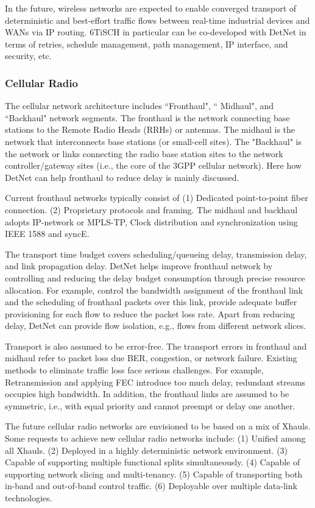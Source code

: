 \documentclass[12pt]{article}
\begin{document}
In the future, wireless networks are expected to enable converged transport of deterministic and best-effort traffic flows between real-time industrial devices and WANs via IP routing. 6TiSCH in particular can be co-developed with DetNet in terms of retries, schedule management, path management, IP interface, and security, etc.

\subsubsection{Cellular Radio}
The cellular network architecture includes ``Fronthaul", `` Midhaul", and ``Backhaul" network segments.  The fronthaul is the network connecting base stations to the Remote Radio Heads (RRHs) or antennas. The midhaul is the network that interconnects base stations (or small-cell sites).  The "Backhaul" is the network or links connecting the radio base station sites to the network    controller/gateway sites (i.e., the core of the 3GPP cellular network). 
Here how DetNet can help fronthaul to reduce delay is mainly discussed.

Current fronthaul networks typically consist of (1) Dedicated point-to-point fiber connection. (2) Proprietary protocols and framing. The midhaul and backhaul adopts IP-network or MPLS-TP, Clock distribution and synchronization using IEEE 1588 and syncE. 

The transport time budget covers scheduling/queueing delay, transmission delay, and link propagation delay. DetNet helps improve fronthaul network by controlling and reducing the delay budget consumption through precise resource allocation. For example,  control the bandwidth assignment of the fronthaul link and the scheduling of fronthaul packets over this link, provide adequate buffer
provisioning for each flow to reduce the packet loss rate.  
Apart from reducing delay, DetNet can provide flow isolation, e.g., flows from different network slices. 

Transport is also assumed to be error-free. The transport errors in fronthaul and midhaul refer to packet loss due BER, congestion, or network failure. Existing methods to eliminate traffic loss face serious challenges. For example, Retransmission and applying FEC introduce too much delay, redundant streams occupies high bandwidth.  In addition, the fronthaul links are assumed to be symmetric, i.e., with equal priority and cannot preempt or delay one another.

The future cellular radio networks are envisioned to be based on a mix of Xhauls. Some requests to achieve new cellular radio networks include: (1) Unified among all Xhauls. (2) Deployed in a highly deterministic network environment. (3) Capable of supporting multiple functional splits simultaneously. (4) Capable of supporting network slicing and multi-tenancy. (5) Capable of transporting both in-band and out-of-band control traffic. (6) Deployable over multiple data-link technologies.
\end{document}
